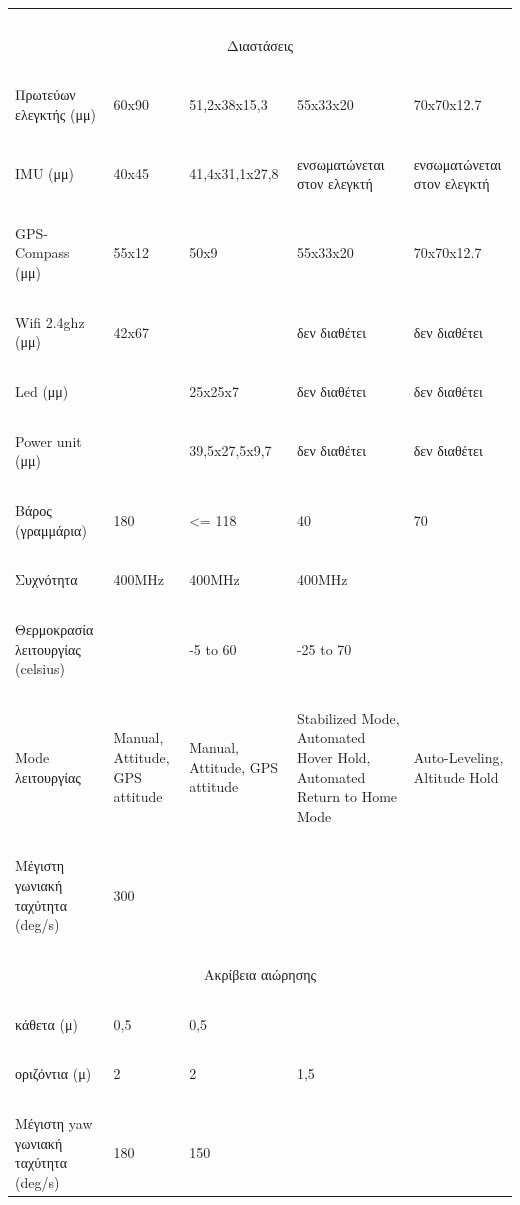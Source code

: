\documentclass[a4paper, 12pt, twoside]{report}
\begin{document}
{{{{{{\begin{landscape}
\begin{longtable} { m{3cm} m{3.5cm} m{3.5cm} m{3.5cm} m{3.5cm} }
					\hdashline
					~\\
					\multicolumn{5}{c}{Διαστάσεις}\\
					\hdashline
					~\\
					Πρωτεύων ελεγκτής (μμ) & 60x90 & 51,2x38x15,3 & 55x33x20 & 70x70x12.7\\
					~\\
					IMU (μμ) & 40x45 & 41,4x31,1x27,8 & ενσωματώνεται στον ελεγκτή & ενσωματώνεται στον ελεγκτή\\
					~\\
					GPS-Compass (μμ) & 55x12 & 50x9 & 55x33x20 & 70x70x12.7\\
					~\\
					Wifi 2.4ghz (μμ) & 42x67 & & δεν διαθέτει & δεν διαθέτει\\
					~\\
					Led (μμ) & & 25x25x7 & δεν διαθέτει & δεν διαθέτει\\
					~\\
					Power unit (μμ) & & 39,5x27,5x9,7 & δεν διαθέτει & δεν διαθέτει\\
					\hdashline
					~\\
					Βάρος (γραμμάρια) & 180 & <= 118 & 40 & 70\\
					\hdashline
					~\\
					Συχνότητα & 400MHz & 400MHz & 400MHz & \\
					\hdashline
					~\\
					Θερμοκρασία λειτουργίας (celsius) & & -5 to 60 & -25 to 70 & \\
					\hdashline
					~\\
					Mode λειτουργίας & Manual, Attitude, GPS attitude & Manual, Attitude, GPS attitude & Stabilized Mode, Automated Hover Hold, Automated Return to Home Mode & Auto-Leveling, Altitude Hold\\
					\hdashline
					~\\
					Μέγιστη γωνιακή ταχύτητα (deg/s) & 300  & & & \\
					\hdashline
					~\\
					\multicolumn{5}{c}{Ακρίβεια αιώρησης}\\
					~\\
					κάθετα (μ) & 0,5 & 0,5 & & \\
					~\\
					οριζόντια (μ) & 2 & 2 & 1,5 & \\
					\hdashline
					~\\
					Μέγιστη yaw γωνιακή ταχύτητα (deg/s) & 180 & 150  & & \\

\end{longtable}
\end{landscape}}}}}}}
\end{document}
